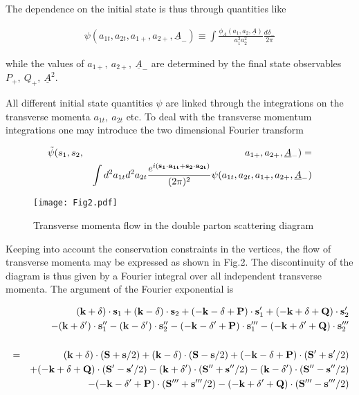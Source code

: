 \documentclass{ws-rv9x6}
\begin{document}
The dependence on the initial state is thus through quantities like

\begin{eqnarray}
\psi(a_{1t},a_{2t},a_{1+},a_{2+},\underline A_-)\equiv\int\frac{\phi_A(a_1,a_2,\underline A)}{a_1^2a_2^2}\frac{d\delta_-}{2\pi}
\end{eqnarray}

\noindent while the values of $a_{1+},\ a_{2+},\ \underline A_-$ are determined by the final state observables $P_+,\ Q_+,\ \underline A^2$. 

All different initial state quantities $\psi$ are linked through the integrations on the transverse momenta $a_{1t},\ a_{2t}$ etc. To deal with the transverse momentum integrations one may introduce the two dimensional Fourier transform 

\begin{eqnarray}
\tilde\psi(s_{1},s_{2}&,&a_{1+},a_{2+},\underline A_-)=\cr
&&\int d^2a_{1t}d^2a_{2t}\frac{e^{i({\bf s_{1}\cdot a_{1t} +s_{2}\cdot a_{2t}})}}{(2\pi)^2}\psi(a_{1t},a_{2t},a_{1+},a_{2+},\underline A_-)
\end{eqnarray}

\begin{figure}[htp]
\centering
\texttt{[image: Fig2.pdf]}
\vspace{0cm}
\caption{Transverse momenta flow in the double parton scattering diagram}
\label{fig:transverse_double}
\end{figure}

\noindent Keeping into account the conservation constraints in the vertices, the flow of transverse momenta may be expressed as shown in Fig.2. The discontinuity of the diagram is thus given by a Fourier integral over all independent transverse momenta. The argument of the Fourier exponential is

\begin{eqnarray}
&&\bf (k+\delta)\cdot s_{\rm 1}+(k-\delta)\cdot s_{\rm 2}+(-k-\delta+P)\cdot s_{\rm 1}'+(-k+\delta+Q)\cdot s_{\rm 2}'\nonumber\\
&&\bf-(k+\delta')\cdot s_{\rm 1}''-(k-\delta')\cdot s_{\rm 2}''-(-k-\delta'+P)\cdot s_{\rm 1}'''-(-k+\delta'+Q)\cdot s_{\rm 2}'''\nonumber\\
\\
&=&\bf (k+\delta)\cdot (S+s/{\rm 2})+(k-\delta)\cdot (S-s/{\rm 2})+(-k-\delta+P)\cdot (S'+s'/{\rm 2})\nonumber\\
&&\bf+(-k+\delta+Q)\cdot (S'-s'/{\rm 2})
-(k+\delta')\cdot (S''+s''/{\rm 2})-(k-\delta')\cdot (S''-s''/{\rm 2})\nonumber\\
&&\bf-(-k-\delta'+P)\cdot (S'''+s'''/{\rm 2})-(-k+\delta'+Q)\cdot (S'''-s'''/{\rm 2})\nonumber
\end{eqnarray}
\end{document}
